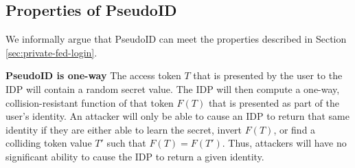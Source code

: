 \documentclass[11pt]{llncs}
\begin{document}

\subsection{Properties of PseudoID}

We informally argue that PseudoID can meet the properties described in
Section \ref{sec:private-fed-login}. 

\begin{claim}[1]\textbf{PseudoID is one-way}
  The access token $T$ that is presented by the user to the IDP will
  contain a random secret value. The IDP will then compute a one-way,
  collision-resistant function of that token $F(T)$ that is presented
  as part of the user's identity. An attacker will only be able to
  cause an IDP to return that same identity if they are either able to
  learn the secret, invert $F(T)$, or find a colliding token value
  $T'$ such that $F(T) = F(T')$. Thus, attackers will have no
  significant ability to cause the IDP to return a given identity.
\end{claim}
\end{document}
